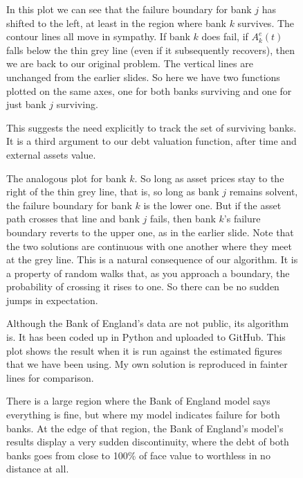 \documentclass[a4paper,11pt]{article}
\newcommand{\ass}[2]{A^{e}_{#1}(#2)}
\begin{document}
  \begin{figure}[H]
    \begin{center}
    \end{center}
    \ttfamily
    In this plot we can see that the failure boundary for bank $j$ has shifted to the left, at least in the region where bank $k$ survives.
    The contour lines all move in sympathy.
    If bank $k$ does fail, if $\ass{k}{t}$ falls below the thin grey line (even if it subsequently recovers), then we are back to our original problem.
    The vertical lines are unchanged from the earlier slides.
    So here we have two functions plotted on the same axes, one for both banks surviving and one for just bank $j$ surviving.

    This suggests the need explicitly to track the set of surviving banks.
    It is a third argument to our debt valuation function, after time and external assets value.
  \end{figure}
  \begin{figure}[H]
    \begin{center}
    \end{center}
    \ttfamily
    The analogous plot for bank $k$. So long as asset prices stay to the right of the thin grey line,
    that is, so long as bank $j$ remains solvent,
    the failure boundary for bank $k$ is the lower one.
    But if the asset path crosses that line and bank $j$ fails, then bank $k$'s failure boundary reverts to the upper one, as in the earlier slide.
    Note that the two solutions are continuous with one another where they meet at the grey line.
    This is a natural consequence of our algorithm. It is a property of random walks that,
    as you approach a boundary, the probability of crossing it rises to one.
    So there can be no sudden jumps in expectation.
  \end{figure}
  \begin{figure}[H]
    \begin{center}
    \end{center}
    \ttfamily
    Although the Bank of England's data are not public, its algorithm is.
    It has been coded up in Python and uploaded to GitHub.
    This plot shows the result when it is run against the estimated figures that we have been using.
    My own solution is reproduced in fainter lines for comparison.

    There is a large region where the Bank of England model says everything is fine, but where my model indicates failure for both banks.
    At the edge of that region, the Bank of England's model's results display a very sudden discontinuity,
    where the debt of both banks goes from close to 100\% of face value to worthless in no distance at all.
  \end{figure}
\end{document}
